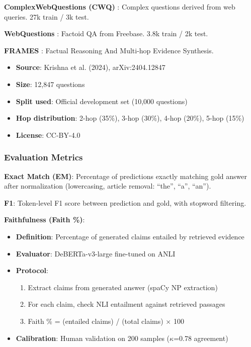 \documentclass[10pt,twocolumn]{article}
\begin{document}
\textbf{ComplexWebQuestions (CWQ)} \cite{talmor2018complexwebq}: Complex questions derived from web queries. 27k train / 3k test.

\textbf{WebQuestions} \cite{berant2013webquestions}: Factoid QA from Freebase. 3.8k train / 2k test.

\textbf{FRAMES} \cite{krishna2024frames}: Factual Reasoning And Multi-hop Evidence Synthesis.
\begin{itemize}
    \item \textbf{Source}: Krishna et al. (2024), arXiv:2404.12847
    \item \textbf{Size}: 12,847 questions
    \item \textbf{Split used}: Official development set (10,000 questions)
    \item \textbf{Hop distribution}: 2-hop (35\%), 3-hop (30\%), 4-hop (20\%), 5-hop (15\%)
    \item \textbf{License}: CC-BY-4.0
\end{itemize}

\subsubsection{Evaluation Metrics}
\label{sec:metrics}

\textbf{Exact Match (EM)}: Percentage of predictions exactly matching gold answer after normalization (lowercasing, article removal: ``the'', ``a'', ``an'').

\textbf{F1}: Token-level F1 score between prediction and gold, with stopword filtering.

\textbf{Faithfulness (Faith \%)}:
\begin{itemize}
    \item \textbf{Definition}: Percentage of generated claims entailed by retrieved evidence
    \item \textbf{Evaluator}: DeBERTa-v3-large \cite{he2021deberta} fine-tuned on ANLI
    \item \textbf{Protocol}:
    \begin{enumerate}
        \item Extract claims from generated answer (spaCy NP extraction)
        \item For each claim, check NLI entailment against retrieved passages
        \item Faith \% = (entailed claims) / (total claims) $\times$ 100
    \end{enumerate}
    \item \textbf{Calibration}: Human validation on 200 samples ($\kappa$=0.78 agreement)
\end{itemize}
\end{document}
